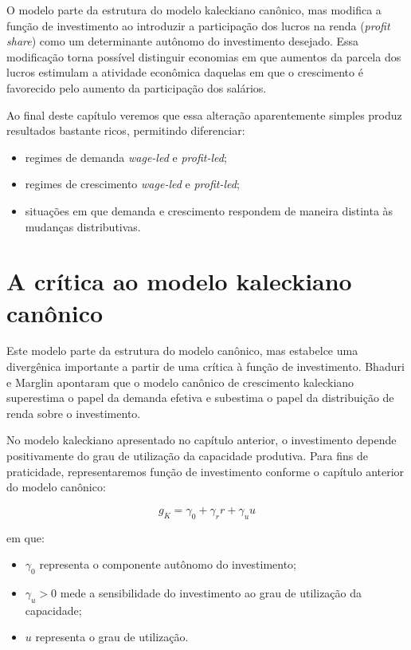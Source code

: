\documentclass[
  brazilian,
  letterpaper,
  DIV=11,
  numbers=noendperiod]{scrreprt}
\providecommand{\tightlist}{%
  \setlength{\itemsep}{0pt}\setlength{\parskip}{0pt}}
\begin{document}
O modelo parte da estrutura do modelo kaleckiano canônico, mas modifica
a função de investimento ao introduzir a participação dos lucros na
renda (\emph{profit share}) como um determinante autônomo do
investimento desejado. Essa modificação torna possível distinguir
economias em que aumentos da parcela dos lucros estimulam a atividade
econômica daquelas em que o crescimento é favorecido pelo aumento da
participação dos salários.

Ao final deste capítulo veremos que essa alteração aparentemente simples
produz resultados bastante ricos, permitindo diferenciar:

\begin{itemize}
\tightlist
\item
  regimes de demanda \emph{wage-led} e \emph{profit-led};
\item
  regimes de crescimento \emph{wage-led} e \emph{profit-led};
\item
  situações em que demanda e crescimento respondem de maneira distinta
  às mudanças distributivas.
\end{itemize}

\section{A crítica ao modelo kaleckiano canônico}\label{sec-critica-bm}

Este modelo parte da estrutura do modelo canônico, mas estabelce uma
divergênica importante a partir de uma crítica à função de investimento.
Bhaduri e Marglin apontaram que o modelo canônico de crescimento
kaleckiano superestima o papel da demanda efetiva e subestima o papel da
distribuição de renda sobre o investimento.

No modelo kaleckiano apresentado no capítulo anterior, o investimento
depende positivamente do grau de utilização da capacidade produtiva.
Para fins de praticidade, representaremos função de investimento
conforme o capítulo anterior do modelo canônico:

\[g_{K}=\gamma_0+\gamma_r r + \gamma_u u\]

em que:

\begin{itemize}
\tightlist
\item
  \(\gamma_0\) representa o componente autônomo do investimento;
\item
  \(\gamma_u>0\) mede a sensibilidade do investimento ao grau de
  utilização da capacidade;
\item
  \(u\) representa o grau de utilização.
\end{itemize}
\end{document}
